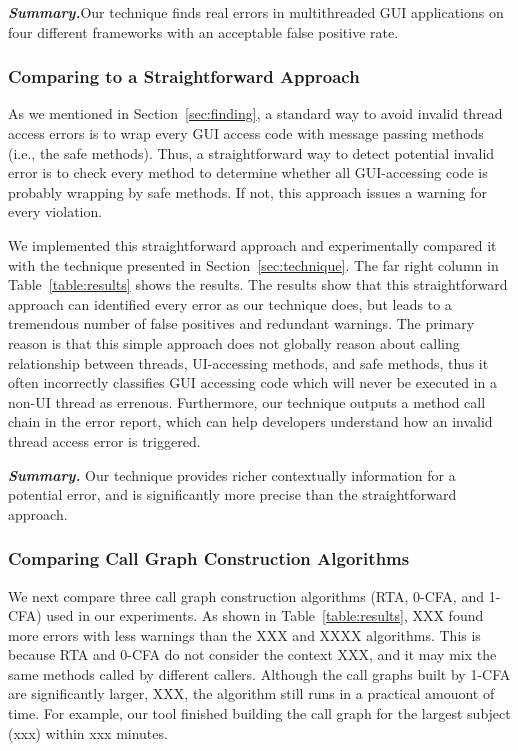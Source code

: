 \noindent \textbf{\textit{Summary.}}Our technique finds real errors
in multithreaded GUI applications on four different frameworks with
an acceptable false positive rate.

\subsubsection{Comparing to a Straightforward Approach}
\label{sec:straightforward}

As we mentioned in Section~\ref{sec:finding}, a standard way to avoid
invalid thread access errors is to wrap every GUI access code
with message passing methods (i.e., the safe methods). Thus, a
straightforward way to detect potential invalid error
is to check every method to determine whether all GUI-accessing code
is probably wrapping by safe methods. If not, this approach
issues a warning for every violation. 

We implemented this straightforward approach and experimentally compared it
with the technique presented in Section~\ref{sec:technique}.
The far right column in Table~\ref{table:results} shows the results.
The results show that this straightforward approach can identified every
error as our technique does, but leads to a tremendous number of false
positives and redundant warnings. The primary reason is that this simple approach
does not globally reason about calling relationship between
threads, UI-accessing methods, and safe methods, thus it often incorrectly
classifies GUI accessing code which will never be executed
in a non-UI thread as errenous. Furthermore, our technique
outputs a method call chain in the error report, which can help
developers understand how an invalid thread access error is triggered.



\vspace{1mm}

\noindent \textbf{\textit{Summary.}} Our technique provides
richer contextually information for a potential error, and 
is significantly more precise than the straightforward approach.

\subsubsection{Comparing Call Graph Construction Algorithms}
\label{sec:reflectionaware}

We next compare three call graph construction algorithms (RTA, 0-CFA, and 1-CFA)
used in our experiments. As shown in Table~\ref{table:results},  XXX found
more errors with less warnings than the XXX and XXXX algorithms. This
is because RTA and 0-CFA do not consider the context XXX, and it may
mix the same methods called by different callers. Although the call graphs
built by 1-CFA are significantly larger, XXX, the algorithm still runs
in a practical amouont of time. For example,
our tool finished building the call graph for the largest subject (xxx)
within xxx minutes.

